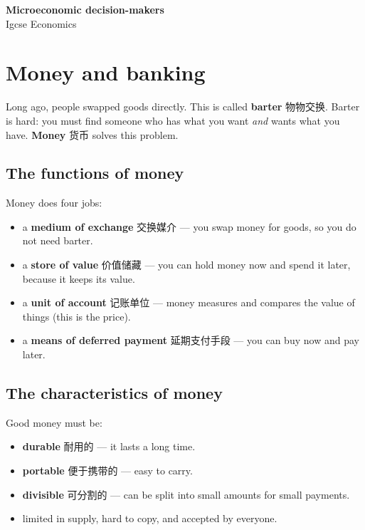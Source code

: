 \documentclass[11pt]{article}
\begin{document}
\begin{center}
  {\LARGE\bfseries Microeconomic decision-makers}\\[0.35em]
  {\large Igcse Economics}
\end{center}
\vspace{0.6em}

\section*{Money and banking}

Long ago, people swapped goods directly. This is called \textbf{barter} 物物交换. Barter is hard: you must find someone who has what you want \emph{and} wants what you have. \textbf{Money} 货币 solves this problem.

\subsection*{The functions of money}

Money does four jobs:

\begin{itemize}
\item a \textbf{medium of exchange} 交换媒介 — you swap money for goods, so you do not need barter.

\item a \textbf{store of value} 价值储藏 — you can hold money now and spend it later, because it keeps its value.

\item a \textbf{unit of account} 记账单位 — money measures and compares the value of things (this is the price).

\item a \textbf{means of deferred payment} 延期支付手段 — you can buy now and pay later.

\end{itemize}

\subsection*{The characteristics of money}

Good money must be:

\begin{itemize}
\item \textbf{durable} 耐用的 — it lasts a long time.

\item \textbf{portable} 便于携带的 — easy to carry.

\item \textbf{divisible} 可分割的 — can be split into small amounts for small payments.

\item limited in supply, hard to copy, and accepted by everyone.

\end{itemize}
\end{document}
